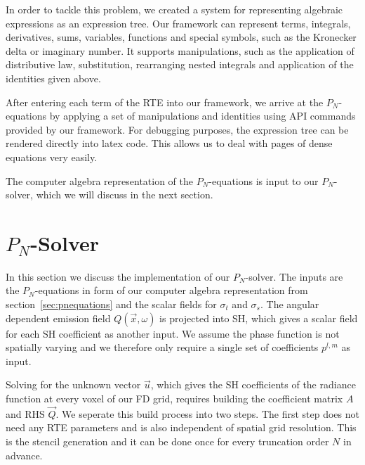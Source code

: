 In order to tackle this problem, we created a system for representing algebraic expressions as an expression tree. Our framework can represent terms, integrals, derivatives, sums, variables, functions and special symbols, such as the Kronecker delta or imaginary number. It supports manipulations, such as the application of distributive law, substitution, rearranging nested integrals and application of the identities given above.

After entering each term of the RTE into our framework, we arrive at the $P_N$-equations by applying a set of manipulations and identities using API commands provided by our framework. For debugging purposes, the expression tree can be rendered directly into latex code. This allows us to deal with pages of dense equations very easily.

The computer algebra representation of the $P_N$-equations is input to our $P_N$-solver, which we will discuss in the next section.

\section{$P_N$-Solver}
\label{sec:pnsolver}


\begin{figure*}[t]
\centering
{}
\label{fig:pnsolver}
\end{figure*}

In this section we discuss the implementation of our $P_N$-solver. The inputs are the $P_N$-equations in form of our computer algebra representation from section~\ref{sec:pnequations} and the scalar fields for $\sigma_t$ and $\sigma_s$. The angular dependent emission field $Q\left(\vec{x}, \omega\right)$ is projected into SH, which gives a scalar field for each SH coefficient as another input. We assume the phase function is not spatially varying and we therefore only require a single set of coefficients $p^{l,m}$ as input.

Solving for the unknown vector $\vec{u}$, which gives the SH coefficients of the radiance function at every voxel of our FD grid, requires building the coefficient matrix $A$ and RHS $\vec{Q}$. We seperate this build process into two steps. The first step does not need any RTE parameters and is also independent of spatial grid resolution. This is the stencil generation and it can be done once for every truncation order $N$ in advance.

